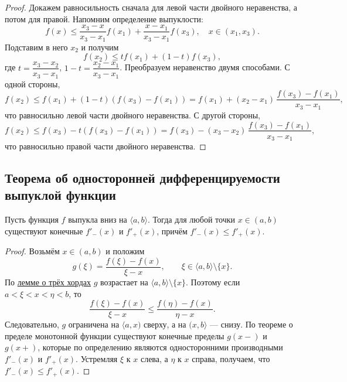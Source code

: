 \begin{proof}
	Докажем равносильность сначала для левой части двойного неравенства, а потом для правой.
	Напомним определение выпуклости: \[
	f(x) \leqslant \frac{x_3 - x}{x_3 - x_1} f(x_1) + \frac{x - x_1}{x_3 - x_1} f(x_3), \quad x \in (x_1, x_3).
	\]
	Подставим в него \(x_2\) и получим \[
	f(x_2) \leqslant t f(x_1) + (1 - t) f(x_3),
	\]
	где \(t = \dfrac{x_3 - x_2}{x_3 - x_1}\), \(1 - t = \dfrac{x_2 - x_1}{x_3 - x_1}\).
	Преобразуем неравенство двумя способами. С одной стороны, \[
	f(x_2) \leqslant f(x_1) + (1 - t)(f(x_3) - f(x_1)) = f(x_1) + (x_2 - x_1) \, \frac{f(x_3) - f(x_1)}{x_3 - x_1},
	\]
	что равносильно левой части двойного неравенства. С другой стороны, \[
	f(x_2) \leqslant f(x_3) - t (f(x_3) - f(x_1)) = f(x_3) - (x_3 - x_2) \, \frac{f(x_3) - f(x_1)}{x_3 - x_1},
	\] что равносильно правой части двойного неравенства.
\end{proof}

\subsection{Теорема об односторонней дифференцируемости выпуклой функции}

\begin{theorem}
	Пусть функция \(f\) выпукла вниз на \(\langle a, b \rangle\). Тогда для любой точки \(x \in (a, b)\) существуют конечные \(f'_-(x)\) и \(f'_+(x)\), причём \(f'_-(x) \leqslant f'_+(x)\).
\end{theorem}

\begin{proof}
	Возьмём \(x \in (a, b)\) и положим \[
	g(\xi) = \frac{f(\xi) - f(x)}{\xi - x}, \qquad \xi \in \langle a, b \rangle \setminus \{x\}.
	\]
	По \hyperlink{trihordy}{лемме о трёх хордах} \(g\) возрастает на \(\langle a, b \rangle \setminus \{x\}\). Поэтому если \hbox{\(a < \xi < x < \eta < b\)}, то \[
	\frac{f(\xi) - f(x)}{\xi - x} \leqslant \frac{f(\eta) - f(x)}{\eta - x}.
	\]
	Следовательно, \(g\) ограничена на \(\langle a, x)\) сверху, а на \((x, b \rangle\) --- снизу. По теореме о пределе монотонной функции существуют конечные пределы \(g(x-)\) и \(g(x+)\), которые по определению являются односторонними производными \(f'_-(x)\) и \(f'_+(x)\). Устремляя \(\xi\) к \(x\) слева, а \(\eta\) к \(x\) справа, получаем, что \(f'_-(x) \leqslant f'_+(x)\). 
\end{proof}

